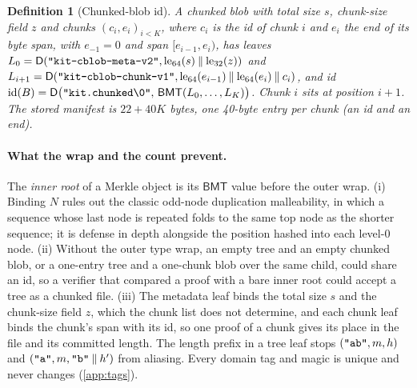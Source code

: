 \documentclass[10pt,letterpaper]{article}
\newtheorem{definition}{Definition}
\theoremstyle{remark}
\newcommand{\D}{\mathsf{D}}
\newcommand{\BMT}{\mathsf{BMT}}
\newcommand{\cc}{\mathbin{\|}}
\newcommand{\str}[1]{\texttt{"\romannumeral-`0#1"}}
\begin{document}
\begin{definition}[Chunked-blob id]\label{def:chunked}
A chunked blob with total size $s$, chunk-size field $z$ and chunks
$(c_i, e_i)_{i<K}$, where $c_i$ is the id of chunk $i$ and $e_i$ the end of its
byte span, with $e_{-1} = 0$ and span $[e_{i-1}, e_i)$, has leaves
$L_0 = \D(\str{kit-cblob-meta-v2}, \mathrm{le}_{64}(s) \cc \mathrm{le}_{32}(z))$
and $L_{i+1} = \D(\str{kit-cblob-chunk-v1}, \mathrm{le}_{64}(e_{i-1}) \cc
\mathrm{le}_{64}(e_i) \cc c_i)$, and id $\mathrm{id}(B) =
\D\bigl(\str{kit.chunked\textbackslash 0},\, \BMT(L_0, \dots, L_K)\bigr)$.
Chunk $i$ sits at position $i+1$. The stored manifest is $22 + 40K$ bytes, one
40-byte entry per chunk (an id and an end).
\end{definition}

\paragraph{What the wrap and the count prevent.}
The \emph{inner root} of a Merkle object is its $\BMT$ value before the outer
wrap. (i) Binding $N$ rules out the classic odd-node duplication
malleability, in which a sequence whose last node is repeated folds to the same
top node as the shorter sequence; it is defense in depth alongside the position
hashed into each level-0 node. (ii)
Without the outer type wrap, an empty tree and an empty chunked blob, or a
one-entry tree and a one-chunk blob over the same child, could share an id, so
a verifier that compared a proof with a bare inner root could accept a tree as
a chunked file. (iii) The metadata leaf binds the total size $s$ and the
chunk-size field $z$, which the chunk list does not determine, and each chunk
leaf binds the chunk's span with its id, so one proof of a chunk gives its place
in the file and its committed length. The length
prefix in a tree leaf stops $(\str{ab}, m, h)$ and $(\str{a}, m, \str{b} \cc
h')$ from aliasing. Every domain tag and magic is unique and never changes
(\cref{app:tags}).
\end{document}

